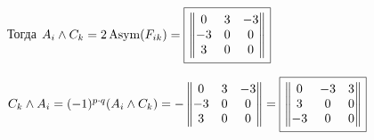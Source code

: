 \documentclass{article}
\newcommand*\squared[1]{\tikz[baseline=(char.base)]{
            \node[shape=rectangle,draw,inner sep=4pt] (char) {#1};}}
\begin{document}
Тогда $A_i \wedge C_k = 2\,\text{Asym}(F_{ik}) = \squared{$\begin{Vmatrix}
0 & 3 & -3 \\
-3 & 0 & 0 \\
3 & 0 & 0
\end{Vmatrix}$}$
\, \\
\begin{center}
$C_k \wedge A_i = (-1)^{p\cdot q}(A_i \wedge C_k) = - \begin{Vmatrix}
0 & 3 & -3 \\
-3 & 0 & 0 \\
3 & 0 & 0
\end{Vmatrix} = \squared{$\begin{Vmatrix}
0 & -3 & 3 \\
3 & 0 & 0 \\
-3 & 0 & 0
\end{Vmatrix}$}$
\end{center}
\end{document}
